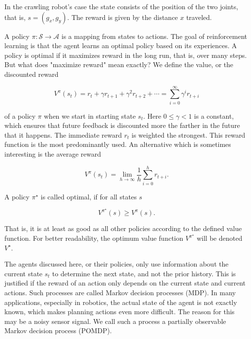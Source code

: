 \documentclass[10pt]{article}
\begin{document}
In the crawling robot's case the state consists of the position of the two joints, that is, $s=\left(g_{x}, g_{y}\right)$. The reward is given by the distance $x$ traveled.

A policy $\pi: \mathcal{S} \rightarrow \mathcal{A}$ is a mapping from states to actions. The goal of reinforcement learning is that the agent learns an optimal policy based on its experiences. A policy is optimal if it maximizes reward in the long run, that is, over many steps. But what does "maximize reward" mean exactly? We define the value, or the discounted reward


\begin{equation*}
V^{\pi}\left(s_{t}\right)=r_{t}+\gamma r_{t+1}+\gamma^{2} r_{t+2}+\cdots=\sum_{i=0}^{\infty} \gamma^{i} r_{t+i} \tag{10.1}
\end{equation*}


of a policy $\pi$ when we start in starting state $s_{t}$. Here $0 \leq \gamma<1$ is a constant, which ensures that future feedback is discounted more the farther in the future that it happens. The immediate reward $r_{t}$ is weighted the strongest. This reward function is the most predominantly used. An alternative which is sometimes interesting is the average reward


\begin{equation*}
V^{\pi}\left(s_{t}\right)=\lim _{h \rightarrow \infty} \frac{1}{h} \sum_{i=0}^{h} r_{t+i} . \tag{10.2}
\end{equation*}


A policy $\pi^{\star}$ is called optimal, if for all states $s$


\begin{equation*}
V^{\pi^{\star}}(s) \geq V^{\pi}(s) . \tag{10.3}
\end{equation*}


That is, it is at least as good as all other policies according to the defined value function. For better readability, the optimum value function $V^{\pi^{\star}}$ will be denoted $V^{\star}$.

The agents discussed here, or their policies, only use information about the current state $s_{t}$ to determine the next state, and not the prior history. This is justified if the reward of an action only depends on the current state and current actions. Such processes are called Markov decision processes (MDP). In many applications, especially in robotics, the actual state of the agent is not exactly known, which makes planning actions even more difficult. The reason for this may be a noisy sensor signal. We call such a process a partially observable Markov decision process (POMDP).
\end{document}
